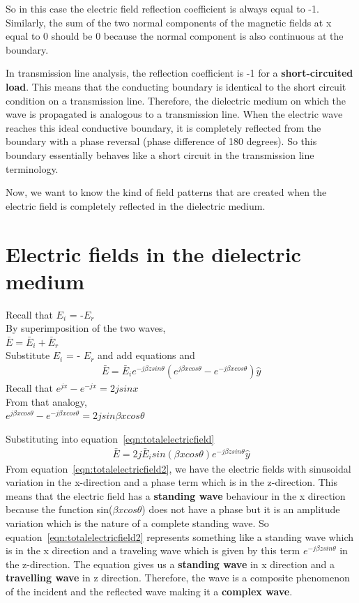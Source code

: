 So in this case the electric field reflection coefficient is always equal to -1. Similarly, the sum of the two normal components of the
magnetic fields at x equal to 0 should be 0 because the normal component is also continuous at the boundary.
 
In transmission line analysis, the reflection coefficient is -1 for a \textbf{short-circuited load}. This means that the conducting boundary is identical to the short circuit condition on a transmission line. Therefore, the dielectric medium on which the wave is propagated is analogous to a transmission line. When the electric wave reaches this ideal conductive boundary, it is completely reflected from the boundary with a phase reversal (phase difference of 180 degrees). So this boundary essentially behaves like a short circuit in the transmission line terminology.

Now, we want to know the kind of field patterns that are created when the electric field is completely reflected in the dielectric medium.
 
\section{Electric fields in the dielectric medium}
Recall that $E_{i}$ = -$E_{r}$\\ 
By superimposition of the two waves,\\ 
$\bar{E}= \bar{E}_i + \bar{E}_r$\\ 
Substitute $E_i$ = - $E_r$ and add equations  and 
\begin{align}
\bar{E}= \bar{E}_i e^{-j\beta zsin\theta} (e^{j\beta xcos\theta }- e^{-j\beta xcos\theta}) \hat{y}
\label{eqn:totalelectricfield}
\end{align}
Recall that $e^{jx} - e^{-jx} = 2jsinx$\\ 
From that analogy,\\ 
$e^{j\beta xcos\theta} - e^{-j\beta xcos\theta} = 2jsin\beta xcos\theta$

Substituting into equation~\ref{eqn:totalelectricfield}
\begin{align}
\bar{E}=2j \bar{E}_i sin(\beta xcos\theta) e^{-j\beta zsin\theta} \hat{y}
\label{eqn:totalelectricfield2}
\end{align}
From equation~\ref{eqn:totalelectricfield2}, we have the electric fields with sinusoidal variation in the x-direction and a phase term which is in the z-direction. This means that the electric field has a \textbf{standing wave} behaviour in the x direction because the function {sin({$\beta xcos\theta$})} does not have a phase but it is an amplitude variation which is the nature of a complete standing wave. So equation~\ref{eqn:totalelectricfield2} represents something like a standing wave which is in the x direction and a traveling wave which is given by this term \textbf{$e^{-j\beta zsin\theta}$} in the z-direction. The equation gives us a \textbf{standing wave} in x direction and a \textbf{travelling wave} in z direction. Therefore, the wave is a composite phenomenon of the incident and the reflected wave making it a \textbf{complex wave}.

